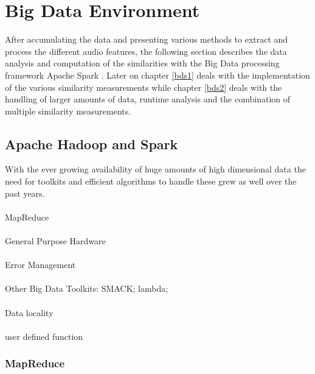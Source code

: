 
\section{Big Data Environment}\label{bdf}

After accumulating the data and presenting various methods to extract and process the different audio features, the following section describes the data analysis and computation of the similarities with the Big Data processing framework Apache Spark \cite{spark}. Later on chapter \ref{bds1} deals with the implementation of the various similarity measurements while chapter \ref{bds2} deals with the handling of larger amounts of data, runtime analysis and the combination of multiple similarity measurements. 

\subsection{Apache Hadoop and Spark} 

With the ever growing availability of huge amounts of high dimensional data the need for toolkits and efficient algorithms to handle these grew as well over the past years.\\
\ \\
MapReduce\\
\ \\
General Purpose Hardware\\
\ \\
Error Management\\
\ \\
Other Big Data Toolkits: SMACK; lambda;\\
\ \\
Data locality\\
\ \\
user defined function\\

\subsubsection{MapReduce}

